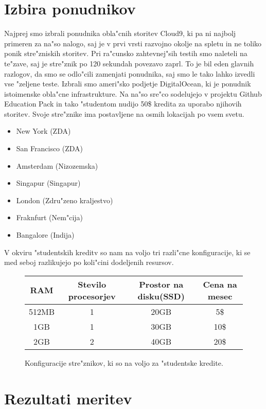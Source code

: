\section{Izbira ponudnikov}
Najprej smo izbrali ponudnika obla"cnih storitev Cloud9, ki pa ni najbolj primeren za na"so nalogo, saj je v prvi vrsti razvojno okolje na spletu in ne toliko ponik stre"zniskih storitev. Pri ra"cunsko zahtevnej"sih testih smo naleteli na te"zave, saj je stre"znik po 120 sekundah povezavo zaprl. To je bil eden glavnih razlogov, da smo se odlo"cili zamenjati ponudnika, saj smo le tako lahko izvedli vse "zeljene teste. Izbrali smo ameri"sko podjetje DigitalOcean, ki je ponudnik istoimenske obla"cne infrastrukture. Na na"so sre"co sodelujejo v projektu Github Education Pack  in tako "studentom nudijo 50\$ kredita za uporabo njihovih storitev. Svoje stre"znike ima postavljene na osmih lokacijah po vsem svetu.
\begin{itemize}
\item New York (ZDA)
\item San Francisco (ZDA)
\item Amsterdam (Nizozemska)
\item Singapur (Singapur)
\item London (Zdru"zeno kraljestvo)
\item Fraknfurt (Nem"cija)
\item Bangalore (Indija)
\end{itemize}

V okviru "studentskih kreditv so nam na voljo tri razli"cne konfiguracije, ki se med seboj razlikujejo po koli"cini dodeljenih resursov.

\begin{figure}[!htbp]
  \centering
  \begin{tabular}{ | c | c | c | c | }
    \hline
    RAM & Stevilo procesorjev & Prostor na disku(SSD) & Cena na mesec\\ \hline
    512MB & 1     & 20GB &  5\$ \\ \hline
    1GB & 1 & 30GB & 10\$ \\ \hline
    2GB & 2 & 40GB & 20\$ \\ \hline
  \end{tabular}
  \caption{Konfiguracije stre"znikov, ki so na voljo za "studentske kredite.}
  \label{8_table1}
  \centering
\end{figure}




\section{Rezultati meritev}


